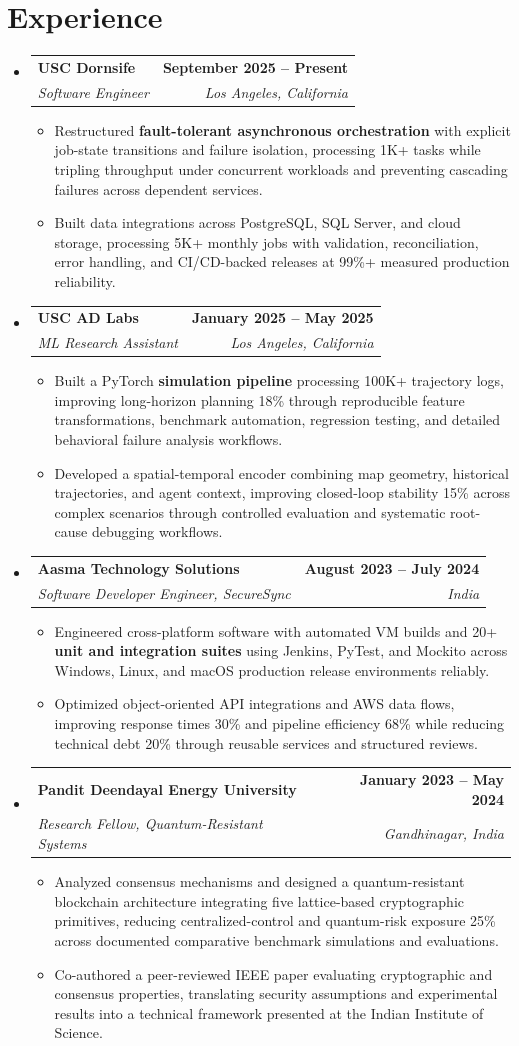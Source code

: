 \documentclass[letterpaper,10pt]{article}
\makeatletter
\newcommand{\itemTail}{\vspace{-4pt}}
\newcommand{\sectionGap}{\vspace{-8pt}}
\newcommand{\roleGap}{\vspace{2pt}}
\newcommand{\resumeItem}[1]{\item\small{{#1 \itemTail}}}
\newcommand{\resumeSubheading}[4]{\vspace{-1pt}\item\begin{tabular*}{1.0\textwidth}[t]{l@{\extracolsep{\fill}}r}\textbf{#1} & \textbf{\small #2} \\\textit{\small#3} & \textit{\small #4} \\\end{tabular*}\vspace{-2pt}}
\newcommand{\resumeSubHeadingListStart}{\begin{itemize}[leftmargin=0.0in, label={}]}
\newcommand{\resumeSubHeadingListEnd}{\end{itemize}}
\newcommand{\resumeItemListStart}{\begin{itemize}[leftmargin=0.15in,label=\textbullet,itemsep=3pt,topsep=0pt,parsep=0pt,partopsep=0pt]}
\newcommand{\resumeItemListEnd}{\end{itemize}\vspace{-4pt}}
\makeatother
\begin{document}
\section{Experience}
\resumeSubHeadingListStart
\resumeSubheading{USC Dornsife}{September 2025 -- Present}{Software Engineer}{Los Angeles, California}
\resumeItemListStart
\resumeItem{Restructured \textbf{fault-tolerant asynchronous orchestration} with explicit job-state transitions and failure isolation, processing 1K+ tasks while tripling throughput under concurrent workloads and preventing cascading failures across dependent services.}
\resumeItem{Built data integrations across PostgreSQL, SQL Server, and cloud storage, processing 5K+ monthly jobs with validation, reconciliation, error handling, and CI/CD-backed releases at 99\%+ measured production reliability.}
\resumeItemListEnd
\roleGap
\resumeSubheading{USC AD Labs}{January 2025 -- May 2025}{ML Research Assistant}{Los Angeles, California}
\resumeItemListStart
\resumeItem{Built a PyTorch \textbf{simulation pipeline} processing 100K+ trajectory logs, improving long-horizon planning 18\% through reproducible feature transformations, benchmark automation, regression testing, and detailed behavioral failure analysis workflows.}
\resumeItem{Developed a spatial-temporal encoder combining map geometry, historical trajectories, and agent context, improving closed-loop stability 15\% across complex scenarios through controlled evaluation and systematic root-cause debugging workflows.}
\resumeItemListEnd
\roleGap
\resumeSubheading{Aasma Technology Solutions}{August 2023 -- July 2024}{Software Developer Engineer, SecureSync}{India}
\resumeItemListStart
\resumeItem{Engineered cross-platform software with automated VM builds and 20+ \textbf{unit and integration suites} using Jenkins, PyTest, and Mockito across Windows, Linux, and macOS production release environments reliably.}
\resumeItem{Optimized object-oriented API integrations and AWS data flows, improving response times 30\% and pipeline efficiency 68\% while reducing technical debt 20\% through reusable services and structured reviews.}
\resumeItemListEnd
\roleGap
\resumeSubheading{Pandit Deendayal Energy University}{January 2023 -- May 2024}{Research Fellow, Quantum-Resistant Systems}{Gandhinagar, India}
\resumeItemListStart
\resumeItem{Analyzed consensus mechanisms and designed a quantum-resistant blockchain architecture integrating five lattice-based cryptographic primitives, reducing centralized-control and quantum-risk exposure 25\% across documented comparative benchmark simulations and evaluations.}
\resumeItem{Co-authored a peer-reviewed IEEE paper evaluating cryptographic and consensus properties, translating security assumptions and experimental results into a technical framework presented at the Indian Institute of Science.}
\resumeItemListEnd
\resumeSubHeadingListEnd
\sectionGap
\end{document}
